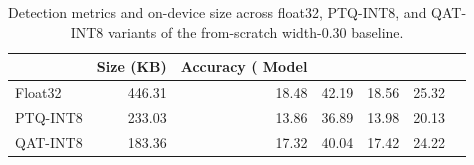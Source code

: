 \begin{table}
\caption{Detection metrics and on-device size across float32, PTQ-INT8, and QAT-INT8 variants of the from-scratch width-0.30 baseline.}
\label{tab:qat_comparison_baseline}
\begin{tabular}{lrrrrr}
\toprule
 & Size (KB) & Accuracy (%
Model &  &  &  &  &  \\
\midrule
Float32 & 446.31 & 18.48 & 42.19 & 18.56 & 25.32 \\
PTQ-INT8 & 233.03 & 13.86 & 36.89 & 13.98 & 20.13 \\
QAT-INT8 & 183.36 & 17.32 & 40.04 & 17.42 & 24.22 \\
\bottomrule
\end{tabular}
\end{table}
